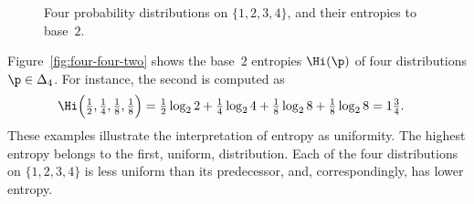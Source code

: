 \begin{figure}
\begin{picture}
% 
% 
% 
\end{picture}
\caption{Four probability distributions on $\{1, 2, 3, 4\}$, and their
  entropies to base~$2$.}  
\end{figure}

\begin{examples}
Figure~\ref{fig:four-four-two} shows the base~$2$ entropies $\Hi(\p)$ of
four distributions $\p \in \Delta_4$.  For instance, the second is computed
as 
% 
\begin{align*}
\Hi\Bigl(\tfrac{1}{2}, \tfrac{1}{4}, \tfrac{1}{8}, \tfrac{1}{8}\Bigr)     &
=
\tfrac{1}{2} \log_2 2 + \tfrac{1}{4} \log_2 4 
+ \tfrac{1}{8} \log_2 8 + \tfrac{1}{8} \log_2 8 
=
1 \tfrac{3}{4}.
\end{align*}
% 
These examples illustrate the interpretation of entropy as uniformity.  The
highest entropy belongs to the first, uniform, distribution.  Each of the
four distributions on $\{1, 2, 3, 4\}$ is less uniform than its
predecessor, and, correspondingly, has lower entropy.
\end{examples}

